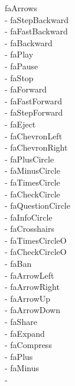 \documentclass[%
               doublesided,
               paper=a4,
               fontsize=10pt
              ]{my-resume}
\begin{document}
faArrows\\ \faStepBackward - faStepBackward\\ \faFastBackward - faFastBackward\\ \faBackward - faBackward\\ \faPlay - faPlay\\ \faPause - faPause\\ \faStop - faStop\\ \faForward - faForward\\ \faFastForward - faFastForward\\ \faStepForward - faStepForward\\ \faEject - faEject\\ \faChevronLeft - faChevronLeft\\ \faChevronRight - faChevronRight\\ \faPlusCircle - faPlusCircle\\ \faMinusCircle - faMinusCircle\\ \faTimesCircle - faTimesCircle\\ \faCheckCircle - faCheckCircle\\ \faQuestionCircle - faQuestionCircle\\ \faInfoCircle - faInfoCircle\\ \faCrosshairs - faCrosshairs\\ \faTimesCircleO - faTimesCircleO\\ \faCheckCircleO - faCheckCircleO\\ \faBan - faBan\\ \faArrowLeft - faArrowLeft\\ \faArrowRight - faArrowRight\\ \faArrowUp - faArrowUp\\ \faArrowDown - faArrowDown\\ \faShare - faShare\\ \faExpand - faExpand\\ \faCompress - faCompress\\ \faPlus - faPlus\\ \faMinus - faMinus\\ \faAsterisk - 
\end{document}
